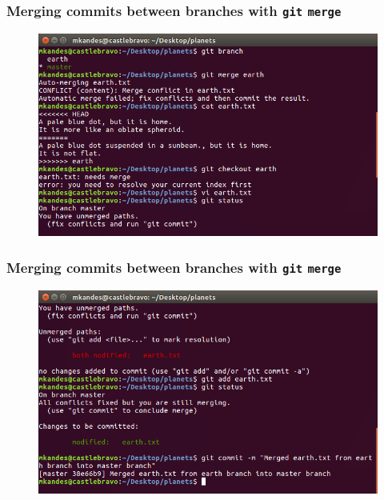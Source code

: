 \documentclass{beamer}
\begin{document}
\begin{frame}
   \frametitle{Merging commits between branches with \texttt{git} \texttt{merge}}
   \begin{figure}[htbp]
      \includegraphics[width=1.0\textwidth]{images/git-merge-with-conflict-part1.png}
   \end{figure}
\end{frame}

\begin{frame}
   \frametitle{Merging commits between branches with \texttt{git} \texttt{merge}}
   \begin{figure}[htbp]
      \includegraphics[width=1.0\textwidth]{images/git-merge-with-conflict-part2.png}
   \end{figure}
\end{frame}
\end{document}
